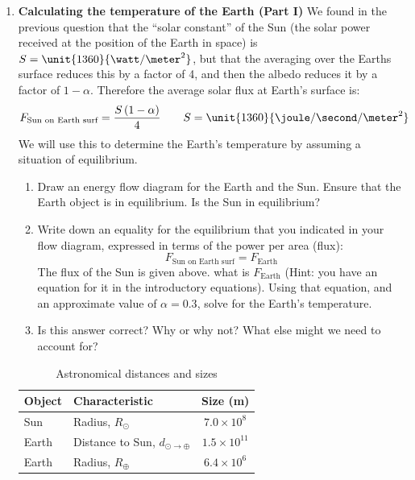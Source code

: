 \documentclass[12pt]{article}
\begin{document}
\begin{enumerate}
\item {\bf Calculating the temperature of the Earth (Part I)}  We found in the previous question that the ``solar constant'' of the Sun (the solar power received at the position of the Earth in space) is $S = \unit{1360}{\watt/\meter^2}$, but that the averaging over the Earths surface reduces this by a factor of 4, and then the albedo reduces it by a factor of $1 - \alpha$.  Therefore the average solar flux at Earth's surface is:
	\begin{equation*}
	F_\text{Sun on Earth surf} = \frac{S \left(1 - \alpha \right)}{4}	\quad \quad S = \unit{1360}{\joule / \second / \meter^2}
	\end{equation*}
We will use this to determine the Earth's temperature by assuming a situation of equilibrium.
	\begin{enumerate}
	\item Draw an energy flow diagram for the Earth and the Sun. Ensure that the Earth object is in equilibrium. Is the Sun in equilibrium?
	\item Write down an equality for the equilibrium that you indicated in your flow diagram, expressed in terms of the power per area (flux):
		\begin{equation*}
		F_\text{Sun on Earth surf} = F_\text{Earth}
		\end{equation*}
	The flux of the Sun is given above. what is $F_\text{Earth}$ (Hint: you have an equation for it in the introductory equations).  Using that equation, and an approximate value of $\alpha = 0.3$, solve for the Earth's temperature.
	\item Is this answer correct?  Why or why not?  What else might we need to account for?
	\end{enumerate}
	
	\begin{table}[t]
	\centering
	\renewcommand{\arraystretch}{1.5}
	\begin{tabular}{|l|l|c|}
	\hline
	{\bf Object} & {\bf Characteristic}  & {\bf Size (m)} \\
	\hline
	\hline
	Sun \hspace{2cm} & Radius, $R_\odot$ \ \hspace{2cm} & $7.0 \times 10^8$ \\
	\hline
	Earth & Distance to Sun, $d_{\odot \rightarrow \oplus}$ & $1.5 \times 10^{11}$ \\
	\hline
	Earth & Radius, $R_\oplus$ & $6.4 \times 10^6$\\
	\hline
	\end{tabular}
	\caption{ \label{table:astronomical-info}
	Astronomical distances and sizes
	}
	\end{table}



\end{enumerate}
\end{document}

